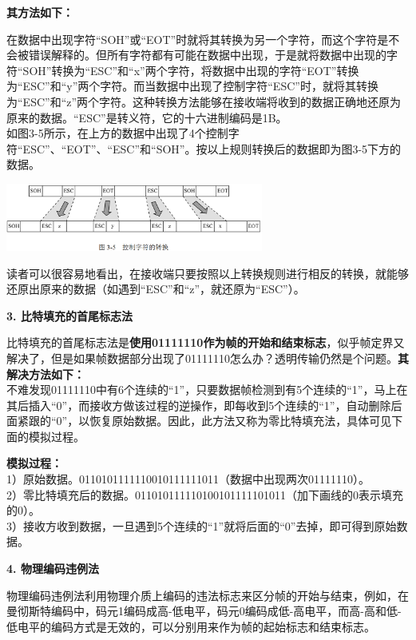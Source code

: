 \textbf{其方法如下：}

在数据中出现字符``SOH''或``EOT''时就将其转换为另一个字符，而这个字符是不会被错误解释的。但所有字符都有可能在数据中出现，于是就将数据中出现的字符``SOH''转换为``ESC''和``x''两个字符，将数据中出现的字符``EOT''转换为``ESC''和``y''两个字符。而当数据中出现了控制字符``ESC''时，就将其转换为``ESC''和``z''两个字符。这种转换方法能够在接收端将收到的数据正确地还原为原来的数据。``ESC''是转义符，它的十六进制编码是1B。\\
如图3-5所示，在上方的数据中出现了4个控制字符``ESC''、``EOT''、``ESC''和``SOH''。按以上规则转换后的数据即为图3-5下方的数据。

\includegraphics[width=3.33333in,height=0.87500in]{png-jpeg-pics/47B60388BAD2BCBCFD0ACE2224A9BF28.png}

读者可以很容易地看出，在接收端只要按照以上转换规则进行相反的转换，就能够还原出原来的数据（如遇到``ESC''和``z''，就还原为``ESC''）。

\textbf{{3. 比特填充的首尾标志法}}

比特填充的首尾标志法是{\textbf{使用01111110作为帧的开始和结束标志}}，似乎帧定界又解决了，但是如果帧数据部分出现了01111110怎么办？透明传输仍然是个问题。\textbf{其解决方法如下：}\\
不难发现01111110中有6个连续的``1''，只要数据帧检测到有5个连续的``1''，马上在其后插入``0''，而接收方做该过程的逆操作，即每收到5个连续的``1''，自动删除后面紧跟的``0''，以恢复原始数据。因此，此方法又称为零比特填充法，具体可见下面的模拟过程。

\textbf{模拟过程：}\\
1）原始数据。0110101111110010111111011（数据中出现两次01111110）。\\
2）零比特填充后的数据。011010111110100101111101011（加下画线的0表示填充的0）。\\
3）接收方收到数据，一旦遇到5个连续的``1''就将后面的``0''去掉，即可得到原始数据。

\textbf{{4. 物理编码违例法}}

物理编码违例法利用物理介质上编码的违法标志来区分帧的开始与结束，例如，在曼彻斯特编码中，码元1编码成高-低电平，码元0编码成低-高电平，而高-高和低-低电平的编码方式是无效的，可以分别用来作为帧的起始标志和结束标志。
